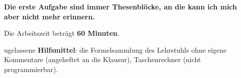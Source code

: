 \documentclass[addpoints]{exam}
\begin{document}
	\makehead

	\textbf{Die erste Aufgabe sind immer Thesenblöcke, an die kann ich mich aber nicht mehr erinnern.}
	
	Die Arbeitszeit beträgt \textbf{60 Minuten}.
	
	ugelassene \textbf{Hilfsmittel}: die Formelsammlung des Lehrstuhls ohne eigene Kommentare (angeheftet an die Klausur), Taschenrechner (nicht programmierbar).

	\begin{center}
		\gradetable[h][questions]
	\end{center}
	\pagebreak
	
	\begin{questions}
		
		
		
		

	\end{questions}
\end{document}
